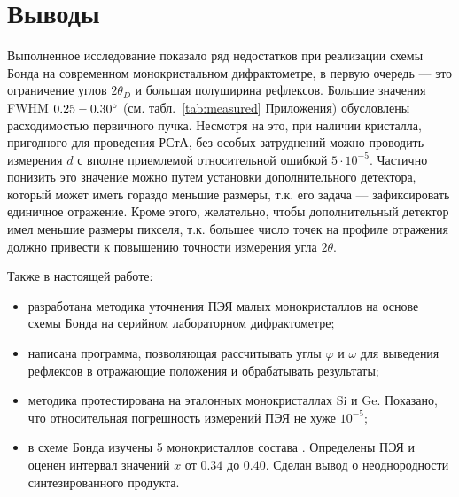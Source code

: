 \section{Выводы}

Выполненное исследование показало ряд недостатков при реализации схемы Бонда на современном монокристальном дифрактометре, в первую очередь --- это ограничение углов $2\theta_D$ и большая полуширина рефлексов.
Большие значения FWHM $0.25-0.30^\circ$ (см. табл.~\ref{tab:measured} Приложения) обусловлены расходимостью первичного пучка.
Несмотря на это, при наличии кристалла, пригодного для проведения РСтА, без особых затруднений можно проводить измерения $d$ с вполне приемлемой относительной ошибкой $5\cdot10^{-5}$.
Частично понизить это значение можно путем установки дополнительного детектора, который может иметь гораздо меньшие размеры, т.к. его задача --- зафиксировать единичное отражение.
Кроме этого, желательно, чтобы дополнительный детектор имел меньшие размеры пикселя, т.к. большее число точек на профиле отражения должно привести к повышению точности измерения угла $2\theta$.

Также в настоящей работе:
\begin{itemize}
    \item разработана методика уточнения ПЭЯ малых монокристаллов на основе схемы Бонда на серийном лабораторном дифрактометре;
    \item написана программа, позволяющая рассчитывать углы $\varphi$ и $\omega$ для выведения рефлексов в отражающие положения и обрабатывать результаты;
    \item методика протестирована на эталонных монокристаллах Si и Ge. Показано, что относительная погрешность измерений ПЭЯ не хуже $10^{-5}$;
    \item в схеме Бонда изучены 5 монокристаллов состава \YEu{}. Определены ПЭЯ и оценен интервал значений $x$ от $0.34$ до $0.40$. Сделан вывод о неоднородности синтезированного продукта.
\end{itemize}
